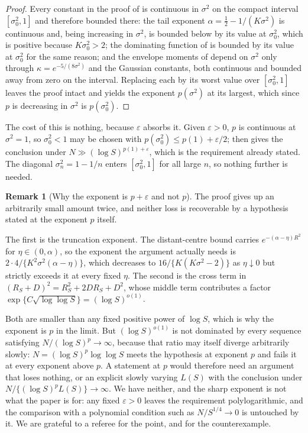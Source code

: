 \documentclass[11pt]{article}
\theoremstyle{definition}
\newtheorem{remark}[remark]{Remark}
\begin{document}
\begin{proof}
Every constant in the proof of  is continuous in $\sigma^2$ on the compact interval $[\sigma_0^2,1]$ and therefore bounded there: the tail exponent $\alpha=\tfrac12-1/(K\sigma^2)$ is continuous and, being increasing in $\sigma^2$, is bounded below by its value at $\sigma_0^2$, which is positive because $K\sigma_0^2>2$; the dominating function of  is bounded by its value at $\sigma_0^2$ for the same reason; and the envelope moments of  depend on $\sigma^2$ only through $\kappa=e^{-5/(8\sigma^2)}$ and the Gaussian constants, both continuous and bounded away from zero on the interval. Replacing each by its worst value over $[\sigma_0^2,1]$ leaves the proof intact and yields the exponent $p(\sigma^2)$ at its largest, which since $p$ is decreasing in $\sigma^2$ is $p(\sigma_0^2)$.
\end{proof}

The cost of this is nothing, because $\varepsilon$ absorbs it. Given $\varepsilon>0$, $p$ is continuous at $\sigma^2=1$, so $\sigma_0^2<1$ may be chosen with $p(\sigma_0^2)\le p(1)+\varepsilon/2$;  then gives the conclusion under $N\gg(\log S)^{p(1)+\varepsilon}$, which is the requirement already stated. The diagonal $\sigma_n^2=1-1/n$ enters $[\sigma_0^2,1]$ for all large $n$, so nothing further is needed.

\begin{remark}[Why the exponent is $p+\varepsilon$ and not $p$]\label{rem:epsilon_loss}
The proof gives up an arbitrarily small amount twice, and neither loss is recoverable by a hypothesis stated at the exponent $p$ itself.

The first is the truncation exponent. The distant-centre bound carries $e^{-(\alpha-\eta)R^2}$ for $\eta\in(0,\alpha)$, so the exponent the argument actually needs is $2\cdot4/\{K^2\sigma^2(\alpha-\eta)\}$, which decreases to $16/\{K(K\sigma^2-2)\}$ as $\eta\downarrow0$ but strictly exceeds it at every fixed $\eta$. The second is the cross term in $(R_S+D)^2=R_S^2+2DR_S+D^2$, whose middle term contributes a factor $\exp\{C\sqrt{\log\log S}\}=(\log S)^{o(1)}$.

Both are smaller than any fixed positive power of $\log S$, which is why the exponent is $p$ in the limit. But $(\log S)^{o(1)}$ is not dominated by every sequence satisfying $N/(\log S)^p\to\infty$, because that ratio may itself diverge arbitrarily slowly: $N=(\log S)^p\log\log S$ meets the hypothesis at exponent $p$ and fails it at every exponent above $p$. A statement at $p$ would therefore need an argument that loses nothing, or an explicit slowly varying $L(S)$ with the conclusion under $N/\{(\log S)^pL(S)\}\to\infty$. We have neither, and the sharp exponent is not what the paper is for: any fixed $\varepsilon>0$ leaves the requirement polylogarithmic, and the comparison with a polynomial condition such as $N/S^{1/4}\to0$ is untouched by it. We are grateful to a referee for the point, and for the counterexample.
\end{remark}
\end{document}
